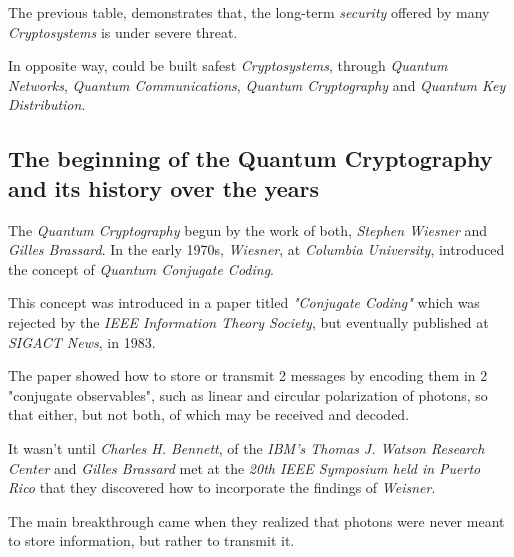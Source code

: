 \documentclass[conference]{IEEEtran}
\begin{document}
\newpage

The previous table, demonstrates that, the long-term \textit{security} offered by many \textit{Cryptosystems} is under severe threat.

\vspace{4pt}

In opposite way, could be built safest \textit{Cryptosystems}, through \textit{Quantum Networks}, \textit{Quantum Communications}, \textit{Quantum Cryptography} and \textit{Quantum Key Distribution}.

\vspace{6pt}

\subsection{The beginning of the Quantum Cryptography\\ and its history over the years}\label{A4}

\vspace{4pt}

The \textit{Quantum Cryptography} begun by the work of both, \textit{Stephen Wiesner} and \textit{Gilles Brassard}. In the early 1970s, \textit{Wiesner}, at \textit{Columbia University}, introduced the concept of \textit{Quantum Conjugate Coding}.

\vspace{4pt}

This concept was introduced in a paper titled \textit{"Conjugate Coding"} which was rejected by the \textit{IEEE Information Theory Society}, but eventually published at \textit{SIGACT News}, in 1983.

\vspace{4pt}

The paper showed how to store or transmit 2 messages by encoding them in 2 "conjugate observables", such as linear and circular polarization of photons, so that either, but not both, of which may be received and decoded.

\vspace{4pt}

It wasn't until \textit{Charles H. Bennett}, of the \textit{IBM's Thomas J. Watson Research Center} and \textit{Gilles Brassard} met at the \textit{20th IEEE Symposium held in Puerto Rico} that they discovered how to incorporate the findings of \textit{Weisner}.

\vspace{4pt}

The main breakthrough came when they realized that photons were never meant to store information, but rather to transmit it.
\end{document}
